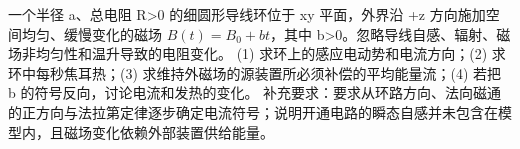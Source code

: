 一个半径 a、总电阻 R>0 的细圆形导线环位于 xy 平面，外界沿 +z 方向施加空间均匀、缓慢变化的磁场 \(B(t)=B_{0}+bt\)，其中 b>0。忽略导线自感、辐射、磁场非均匀性和温升导致的电阻变化。
(1) 求环上的感应电动势和电流方向；(2) 求环中每秒焦耳热；(3) 求维持外磁场的源装置所必须补偿的平均能量流；(4) 若把 b 的符号反向，讨论电流和发热的变化。
补充要求：要求从环路方向、法向磁通的正方向与法拉第定律逐步确定电流符号；说明开通电路的瞬态自感并未包含在模型内，且磁场变化依赖外部装置供给能量。
